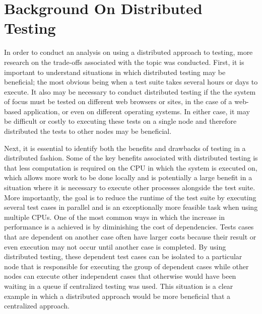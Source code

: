 \documentclass{article}
\begin{document}
{\section{Background On Distributed Testing}
\label{background}

In order to conduct an analysis on using a distributed approach to testing, more research on the trade-offs associated with the topic was conducted. First, it is important to understand situations in which distributed testing may be beneficial; the most obvious being when a test suite takes several hours or days to execute. It also may be necessary to conduct distributed testing if the the system of focus must be tested on different web browsers or sites, in the case of a web-based application, or even on different operating systems. In either case, it may be difficult or costly to executing these tests on a single node and therefore distributed the tests to other nodes may be beneficial. 

Next, it is essential to identify both the benefits and drawbacks of testing in a distributed fashion. Some of the key benefits associated with distributed testing is that less computation is required on the CPU in which the system is executed on, which allows more work to be done locally and is potentially a large benefit in a situation where it is necessary to execute other processes alongside the test suite. More importantly, the goal is to reduce the runtime of the test suite by executing several test cases in parallel and is an exceptionally more feasible task when using multiple CPUs. One of the most common ways in which the increase in performance is a achieved is by diminishing the cost of dependencies. Tests cases that are dependent on another case often have larger costs because their result or even execution may not occur until another case is completed. By using distributed testing, these dependent test cases can be isolated to a particular node that is responsible for executing the group of dependent cases while other nodes can execute other independent cases that otherwise would have been waiting in a queue if centralized testing was used. This situation is a clear example in which a distributed approach would be more beneficial that a centralized approach.

}
\end{document}
